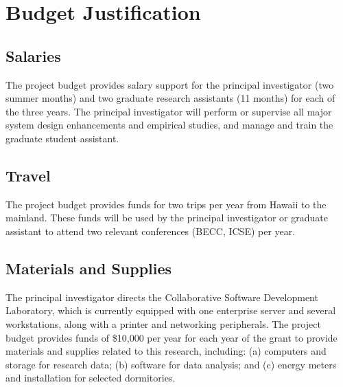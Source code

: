 

\section*{Budget Justification}

\renewcommand{\thepage} {F--\arabic{page}}

\subsection*{Salaries}

The project budget provides salary support for the principal investigator
(two summer months) and two graduate research
assistants (11 months) for each of the three years.  The principal
investigator will perform or supervise all major system design enhancements
and empirical studies, and manage and train the graduate student
assistant.

\subsection*{Travel}

The project budget provides funds for two trips per year from Hawaii to the
mainland.  These funds will be used by the principal investigator or
graduate assistant to attend two relevant conferences (BECC, ICSE) per
year.

\subsection*{Materials and Supplies}

The principal investigator directs the Collaborative Software Development
Laboratory, which is currently equipped with one enterprise server and several
workstations, along with a printer and networking peripherals.  The project
budget provides funds of \$10,000 per year for each year of the grant to
provide materials and supplies related to this research, including: (a)
computers and storage for research data; (b) software for data analysis;
and (c) energy meters and installation for selected dormitories.

